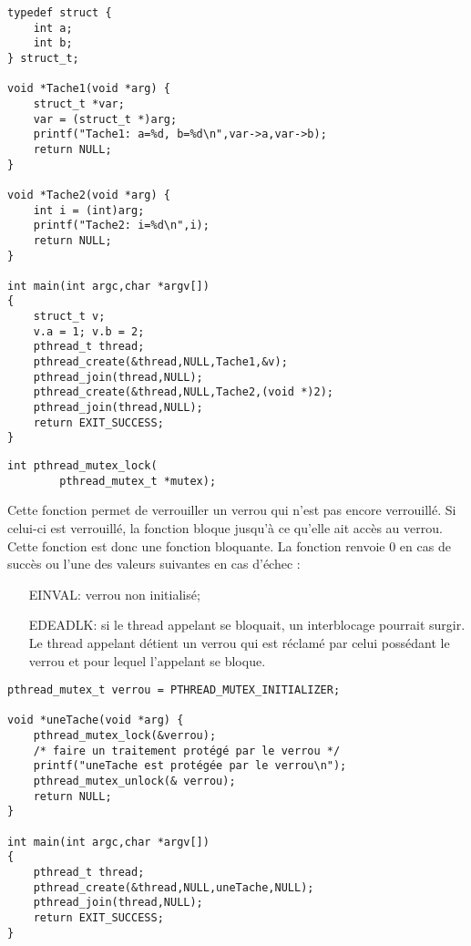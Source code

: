 \begin{lstlisting}[frame=trBL]
typedef struct {
	int a;
	int b;
} struct_t;

void *Tache1(void *arg) {
	struct_t *var;
	var = (struct_t *)arg;
	printf("Tache1: a=%d, b=%d\n",var->a,var->b);
	return NULL;
}

void *Tache2(void *arg) {
	int i = (int)arg;
	printf("Tache2: i=%d\n",i);
	return NULL;
}

int main(int argc,char *argv[])
{
	struct_t v;
	v.a = 1; v.b = 2;
	pthread_t thread;
	pthread_create(&thread,NULL,Tache1,&v);
	pthread_join(thread,NULL);
	pthread_create(&thread,NULL,Tache2,(void *)2);
	pthread_join(thread,NULL);
	return EXIT_SUCCESS;
}
\end{lstlisting}




\label{func:pthread_mutex_lock}

\begin{lstlisting}
int pthread_mutex_lock(
		pthread_mutex_t *mutex);
\end{lstlisting}

Cette fonction permet de verrouiller un verrou qui n'est pas encore verrouillé. Si celui-ci est verrouillé, la fonction bloque jusqu'à ce qu'elle ait accès au verrou. Cette fonction est donc une fonction bloquante. La fonction renvoie 0 en cas de succès ou l'une des valeurs suivantes en cas d'échec :
\begin{itemize}
\item[EINVAL:] verrou non initialisé;
\item[EDEADLK:] si le thread appelant se bloquait, un interblocage pourrait surgir. Le thread appelant détient un verrou qui est réclamé par celui possédant le verrou et pour lequel l'appelant se bloque.
\end{itemize}

\begin{lstlisting}[frame=trBL]
pthread_mutex_t verrou = PTHREAD_MUTEX_INITIALIZER;

void *uneTache(void *arg) {
	pthread_mutex_lock(&verrou);
	/* faire un traitement protégé par le verrou */
	printf("uneTache est protégée par le verrou\n");
	pthread_mutex_unlock(& verrou);
	return NULL;
}

int main(int argc,char *argv[])
{
	pthread_t thread;
	pthread_create(&thread,NULL,uneTache,NULL);
	pthread_join(thread,NULL);
	return EXIT_SUCCESS;
}
\end{lstlisting}




